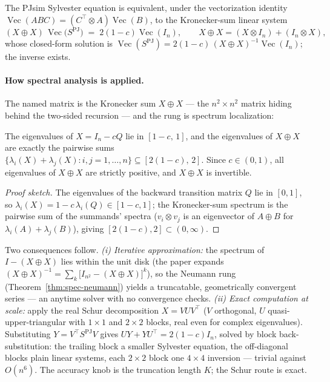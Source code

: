 \begin{theorem}\label{thm:spec-pjsim-closed}
The PJsim Sylvester equation is equivalent, under the vectorization identity
$\operatorname{Vec}(ABC) = (C^{\top}\!\otimes A)\operatorname{Vec}(B)$, to
the Kronecker-sum linear system
\[
(X \oplus X)\,\operatorname{Vec}\bigl(S^{\mathrm{PJ}}\bigr)
\;=\; 2(1-c)\operatorname{Vec}(I_n),
\qquad X \oplus X = (X \otimes I_n) + (I_n \otimes X),
\]
whose closed-form solution is $\operatorname{Vec}(S^{\mathrm{PJ}}) =
2(1-c)\,(X \oplus X)^{-1}\operatorname{Vec}(I_n)$; the inverse exists. \eop
\end{theorem}

\paragraph{How spectral analysis is applied.}
The named matrix is the Kronecker sum $X \oplus X$ --- the $n^2 \times n^2$
matrix hiding behind the two-sided recursion --- and the rung is spectrum
localization:

\begin{lemma}\label{lem:spec-pjsim-spectrum}
The eigenvalues of $X = I_n - cQ$ lie in $[1-c,\, 1]$, and the eigenvalues
of $X \oplus X$ are exactly the pairwise sums $\{\lambda_i(X) +
\lambda_j(X) : i,j = 1,\dots,n\} \subseteq [2(1-c),\, 2]$. Since $c \in
(0,1)$, all eigenvalues of $X \oplus X$ are strictly positive, and $X \oplus
X$ is invertible. \eop
\end{lemma}

\begin{proof}[Proof sketch]
The eigenvalues of the backward transition matrix $Q$ lie in $[0,1]$, so
$\lambda_i(X) = 1 - c\,\lambda_i(Q) \in [1-c, 1]$; the Kronecker-sum
spectrum is the pairwise sum of the summands' spectra ($v_i \otimes v_j$
is an eigenvector of $A \oplus B$ for $\lambda_i(A) + \lambda_j(B)$),
giving $[2(1-c), 2] \subset (0,\infty)$.
\end{proof}

Two consequences follow. \emph{(i) Iterative approximation:} the spectrum
of $I - (X \oplus X)$ lies within the unit disk (the paper expands $(X
\oplus X)^{-1} = \sum_k \bigl[I_{n^2} - (X \oplus X)\bigr]^k$), so the
Neumann rung (Theorem~\ref{thm:spec-neumann}) yields a truncatable,
geometrically convergent series --- an anytime solver with no convergence
checks. \emph{(ii) Exact computation at scale:} apply the real Schur
decomposition $X = VUV^{\top}$ ($V$ orthogonal, $U$ quasi-upper-triangular
with $1 \times 1$ and $2 \times 2$ blocks, real even for complex
eigenvalues). Substituting $Y = V^{\top}S^{\mathrm{PJ}}V$ gives $UY +
YU^{\top} = 2(1-c)I_n$, solved by block back-substitution: the trailing
block a smaller Sylvester equation, the off-diagonal blocks plain linear
systems, each $2 \times 2$ block one $4 \times 4$ inversion --- trivial
against $O(n^6)$. The accuracy knob is the truncation length $K$; the
Schur route is exact.

